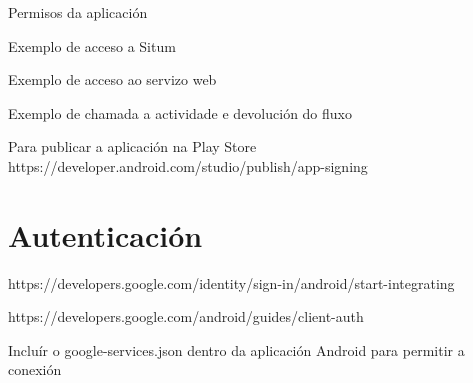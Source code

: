 Permisos da aplicación

Exemplo de acceso a Situm

Exemplo de acceso ao servizo web

Exemplo de chamada a actividade e devolución do fluxo

Para publicar a aplicación na Play Store
https://developer.android.com/studio/publish/app-signing




\section{Autenticación}

https://developers.google.com/identity/sign-in/android/start-integrating


https://developers.google.com/android/guides/client-auth


Incluír o google-services.json dentro da aplicación Android para permitir a conexión
